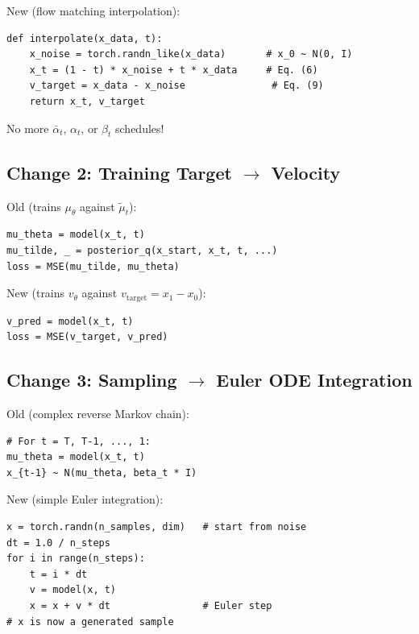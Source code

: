 \documentclass[11pt, a4paper]{article}
\newcommand{\vtheta}{v_\theta}
\newcommand{\mutheta}{\mu_\theta}
\newcommand{\mutilde}{\tilde{\mu}}
\newcommand{\alphabar}{\bar{\alpha}}
\begin{document}
\begin{fmbox}
\vspace{-0.5em}
New (flow matching interpolation):
\begin{lstlisting}
def interpolate(x_data, t):
    x_noise = torch.randn_like(x_data)       # x_0 ~ N(0, I)
    x_t = (1 - t) * x_noise + t * x_data     # Eq. (6)
    v_target = x_data - x_noise               # Eq. (9)
    return x_t, v_target
\end{lstlisting}
\end{fmbox}

No more $\alphabar_t$, $\alpha_t$, or $\beta_t$ schedules!

\subsection{Change 2: Training Target $\to$ Velocity}

\begin{ddpmbox}
\vspace{-0.5em}
Old (trains $\mutheta$ against $\mutilde_t$):
\begin{lstlisting}
mu_theta = model(x_t, t)
mu_tilde, _ = posterior_q(x_start, x_t, t, ...)
loss = MSE(mu_tilde, mu_theta)
\end{lstlisting}
\end{ddpmbox}

\begin{fmbox}
\vspace{-0.5em}
New (trains $\vtheta$ against $v_{\mathrm{target}} = x_1 - x_0$):
\begin{lstlisting}
v_pred = model(x_t, t)
loss = MSE(v_target, v_pred)
\end{lstlisting}
\end{fmbox}

\subsection{Change 3: Sampling $\to$ Euler ODE Integration}

\begin{ddpmbox}
\vspace{-0.5em}
Old (complex reverse Markov chain):
\begin{lstlisting}
# For t = T, T-1, ..., 1:
mu_theta = model(x_t, t)
x_{t-1} ~ N(mu_theta, beta_t * I)
\end{lstlisting}
\end{ddpmbox}

\begin{fmbox}
\vspace{-0.5em}
New (simple Euler integration):
\begin{lstlisting}
x = torch.randn(n_samples, dim)   # start from noise
dt = 1.0 / n_steps
for i in range(n_steps):
    t = i * dt
    v = model(x, t)
    x = x + v * dt                # Euler step
# x is now a generated sample
\end{lstlisting}
\end{fmbox}
\end{document}
